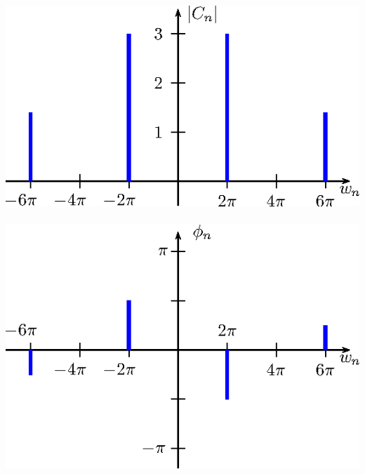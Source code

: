 \begin{resp}
\begin{itemize}
\includegraphics{cap_diagramas_espectro/pics/figura_14}~\includegraphics{cap_diagramas_espectro/pics/figura_15}


\end{itemize}
\end{resp}
